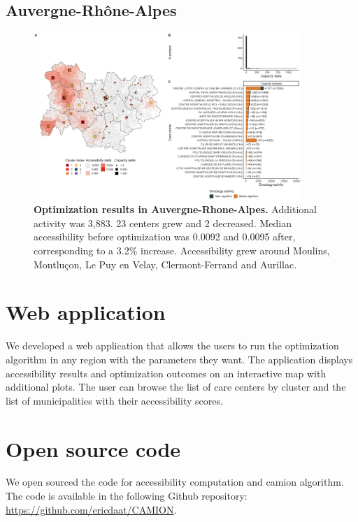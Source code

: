 \subsection*{Auvergne-Rhône-Alpes}

\begin{figure}[H]
    \includegraphics[width=0.9\textwidth]{images/camion/optim_region/optim_Auvergne-Rhone-Alpes.png}
    \centering
    \caption{
        \textbf{Optimization results in Auvergne-Rhone-Alpes.} Additional activity was 3,883. 23 centers grew and 2 decreased. Median accessibility before optimization was 0.0092 and 0.0095 after, corresponding to a 3.2\% increase. Accessibility grew around Moulins, Montluçon, Le Puy en Velay, Clermont-Ferrand and Aurillac.
    }
\end{figure}

\section{Web application}

We developed a web application that allows the users to run the optimization algorithm in any region with the parameters they want. The application displays accessibility results and optimization outcomes on an interactive map with additional plots. The user can browse the list of care centers by cluster and the list of municipalities with their accessibility scores.

\section{Open source code}

We open sourced the code for accessibility computation and \ac{camion} algorithm.
The code is available in the following Github repository: \url{https://github.com/ericdaat/CAMION}.

